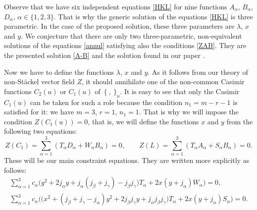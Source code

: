 \documentclass[pdftex]{sigma}
\def\a{\alpha}
\def\b{\beta}
\def\g{\gamma}
\def\l{\lambda}
\numberwithin{equation}{section}
\begin{document}
\begin{Remark}
Observe that we have six independent equations \eqref{HKL} %
 for nine functions $A_{\a}$, $B_{\a}$, $D_{\a}$, $\a \in \{1,2,3\}$. That is why the generic solution of the equations \eqref{HKL} %
 is three parametric. In the case of the proposed solution, these three parameters are $\l$, $x$ and $y$. We conjecture that there are only two three-parametric, non-equivalent solutions of the equations \eqref{annul} satisfying also the conditions \eqref{ZAB}. They are the presented solution \eqref{A-B} and the solution found in our paper \cite{SkrAsSoVExCle}.
\end{Remark}

Now we have to define the functions $\l$, $x$ and $y$. As it follows from our theory of non-St\"ackel vector field $Z$, it should annihilate one of the non-common Casimir functions $C_2(u)$ or $C_1(u)$ of~$\{\ ,\ \}_u$. It is easy to see that only the Casimir $C_1(u)$ can be taken for such a role because the condition $n_1=m-r-1$ is satisfied for it: we have $m=3$, $r=1$, $n_1=1$. That is why we will impose the condition
$Z(C_1(u))=0$,
 that is, we will define the functions $x$ and $y$ from the following two equations:
\[%
Z(C_1)=\sum\limits_{\a=1}^3 (T_{\a} D_{\a}+ W_{\a} B_{\a})= 0, \qquad Z(L)= \sum\limits_{\a=1}^3 (T_{\a} A_{\a}+ S_{\a} B_{\a})= 0.
\]
These will be our main constraint equations. They are written more explicitly as follows:
\begin{subequations}\label{xy}
\begin{gather}
\sum\limits_{\a=1}^3 c_{\a}\bigl(y^2+2j_{\a} y+j_{\a}(j_{\b}+j_{\g})-j_{\b}j_{\g}) T_{\a}+ 2 x (y+j_{\a}) W_{\a} \bigr)= 0,
\\
\sum\limits_{\a=1}^3 c_{\a}\bigl( \big(x^2+ (j_{\b}+j_{\g}-j_{\a}) y^2+2 j_{\b} j_{\g} y + j_{\a} j_{\b} j_{\g}\big) T_{\a}+ 2 x (y+j_{\a}) S_{\a} \bigr)= 0.
\end{gather}
\end{subequations}
\end{document}
